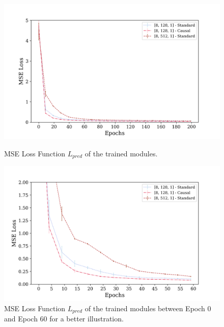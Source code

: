         \begin{figure}[hbtp]
            \centering
            \includegraphics[width=15cm, keepaspectratio]{images/results/module_causal_1.png}
            \caption{MSE Loss Function $L_{pred}$ of the trained modules.}
            \label{fig:results_causal_1}
            
            \vspace{1.5cm}
            
            \includegraphics[width=15cm, keepaspectratio]{images/results/module_causal_2.png}
            \caption{MSE Loss Function $L_{pred}$ of the trained modules between Epoch 0 and Epoch 60 for a better illustration.}
            \label{fig:results_causal_2}
        \end{figure}
        
    \newpage
